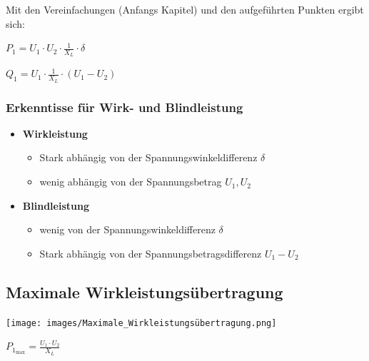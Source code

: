 \vspace{0.15cm}
Mit den Vereinfachungen (Anfangs Kapitel) und den aufgeführten Punkten ergibt sich:
\vspace{0.15cm}

$\boxed{P_1 = U_1 \cdot U_2 \cdot \frac{1}{X_L} \cdot \delta}$ 

$\boxed{Q_1 = U_1 \cdot \frac{1}{X_L} \cdot (U_1 - U_2)}$ 

\vspace{0.15cm}


\subsubsection{Erkenntisse für Wirk- und Blindleistung}

\begin{itemize}
    \item \textbf{Wirkleistung}
    \begin{itemize}
        \item Stark abhängig von der Spannungswinkeldifferenz $\delta$
        \item wenig abhängig von der Spannungsbetrag $U_1, U_2$
    \end{itemize}
    
    \item \textbf{Blindleistung}
    \begin{itemize}
        \item wenig von der Spannungswinkeldifferenz $\delta$
        \item Stark abhängig von der Spannungsbetragsdifferenz $U_1 - U_2$
    \end{itemize}
\end{itemize}




\subsection{Maximale Wirkleistungsübertragung}

\begin{minipage}[c]{0.48\columnwidth}
    \texttt{[image: images/Maximale\_Wirkleistungsübertragung.png]}
\end{minipage}
\hfill
\begin{minipage}[c]{0.48\columnwidth}
    $
    \boxed{P_{1_{\text{max}}} = \frac{U_1 \cdot U_2}{X_L}}
    $
\end{minipage}




